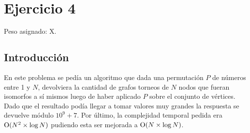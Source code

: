 \section{Ejercicio 4}

Peso asignado: X.

\subsection{Introducción}

En este problema se pedía un algoritmo que dada una permutación $P$ de números
entre 1 y $N$, devolviera la cantidad de grafos torneos de $N$ nodos que fueran
isomorfos a sí mismos luego de haber aplicado $P$ sobre el conjunto de vértices.
Dado que el resultado podía llegar a tomar valores muy grandes la respuesta
se devuelve módulo $10^9 + 7$. Por último, la complejidad temporal pedida era
$\operatorname{O}(N^2 \times \log N)$ pudiendo esta ser mejorada a $\operatorname{O}(N \times \log N)$.
